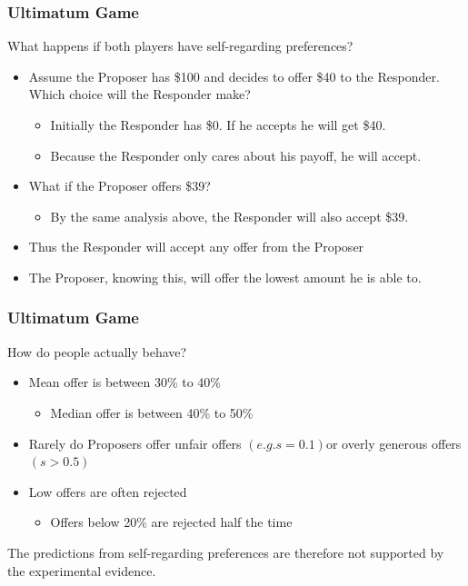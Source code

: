 \documentclass{beamer}
\begin{document}
\begin{frame}
	\frametitle{Ultimatum Game}
	What happens if both players have self-regarding preferences?
	
	\begin{itemize}
		\item Assume the Proposer has \$100 and decides to offer \$40 to the Responder. Which choice will the Responder make?
		\begin{itemize}
			\item Initially the Responder has \$0. If he accepts he will get \$40.
			\item Because the Responder only cares about his payoff, he will accept.
		\end{itemize}
		\item What if the Proposer offers \$39?
		\begin{itemize}
			\item By the same analysis above, the Responder will also accept \$39.
		\end{itemize} 
			\item Thus the Responder will accept any offer from the Proposer
		\item The Proposer, knowing this, will offer the lowest amount he is able to.
	\end{itemize}

\end{frame}

\begin{frame}
	\frametitle{Ultimatum Game}
	How do people actually behave?
	\begin{itemize}
		\item Mean offer is between 30\% to 40\%
		\begin{itemize}
			\item Median offer is between 40\% to 50\%
		\end{itemize}
		\item  Rarely do Proposers offer unfair offers $\left(e.g. s=0.1\right)$or overly generous offers $\left(s>0.5\right)$
		\item  Low offers are often rejected
		\begin{itemize}
			\item Offers below 20\% are rejected half the time
		\end{itemize}
	\end{itemize}

The predictions from self-regarding preferences are therefore not supported by the experimental evidence.

\end{frame}
\end{document}

